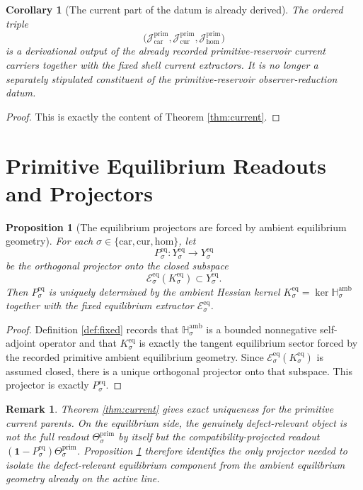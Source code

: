 \documentclass[11pt]{article}
\newcommand{\Car}{\mathrm{car}}
\newcommand{\Cur}{\mathrm{cur}}
\newcommand{\Hom}{\mathrm{hom}}
\newcommand{\PrimCurrent}[1]{\mathcal J_{#1}^{\mathrm{prim}}}
\newcommand{\PrimTheta}[1]{\Theta_{#1}^{\mathrm{prim}}}
\newcommand{\EqProj}[1]{P_{#1}^{\mathrm{eq}}}
\newcommand{\EqExtract}[1]{\mathscr E_{#1}^{\mathrm{eq}}}
\newcommand{\AmbientHess}[1]{\mathbb H_{#1}^{\mathrm{amb}}}
\newcommand{\EqKernel}[1]{K_{#1}^{\mathrm{eq}}}
\newtheorem{proposition}{Proposition}
\newtheorem{remark}{Remark}
\newtheorem{corollary}{Corollary}
\begin{document}
\begin{corollary}[The current part of the datum is already derived]
\label{cor:current}
The ordered triple
\[
\bigl(
\PrimCurrent{\Car},
\PrimCurrent{\Cur},
\PrimCurrent{\Hom}
\bigr)
\]
is a derivational output of the already recorded primitive-reservoir current carriers together with the fixed shell current extractors. It is no longer a separately stipulated constituent of the primitive-reservoir observer-reduction datum.
\end{corollary}

\begin{proof}
This is exactly the content of Theorem \ref{thm:current}.
\end{proof}

\section{Primitive Equilibrium Readouts and Projectors}

\begin{proposition}[The equilibrium projectors are forced by ambient equilibrium geometry]
\label{prop:eqproj}
For each \(\sigma\in\{\Car,\Cur,\Hom\}\), let
\begin{equation}
\EqProj{\sigma}:Y_{\sigma}^{\mathrm{eq}}\to Y_{\sigma}^{\mathrm{eq}}
\label{eq:eqproj_def}
\end{equation}
be the orthogonal projector onto the closed subspace
\[
\EqExtract{\sigma}(\EqKernel{\sigma})
\subset Y_{\sigma}^{\mathrm{eq}}.
\]
Then \(\EqProj{\sigma}\) is uniquely determined by the ambient Hessian kernel \(\EqKernel{\sigma}=\ker\AmbientHess{\sigma}\) together with the fixed equilibrium extractor \(\EqExtract{\sigma}\).
\end{proposition}

\begin{proof}
Definition \ref{def:fixed} records that \(\AmbientHess{\sigma}\) is a bounded nonnegative self-adjoint operator and that \(\EqKernel{\sigma}\) is exactly the tangent equilibrium sector forced by the recorded primitive ambient equilibrium geometry. Since \(\EqExtract{\sigma}(\EqKernel{\sigma})\) is assumed closed, there is a unique orthogonal projector onto that subspace. This projector is exactly \(\EqProj{\sigma}\).
\end{proof}

\begin{remark}
Theorem \ref{thm:current} gives exact uniqueness for the primitive current parents. On the equilibrium side, the genuinely defect-relevant object is not the full readout \(\PrimTheta{\sigma}\) by itself but the compatibility-projected readout \((\mathbf 1-\EqProj{\sigma})\PrimTheta{\sigma}\). Proposition \ref{prop:eqproj} therefore identifies the only projector needed to isolate the defect-relevant equilibrium component from the ambient equilibrium geometry already on the active line.
\end{remark}
\end{document}
